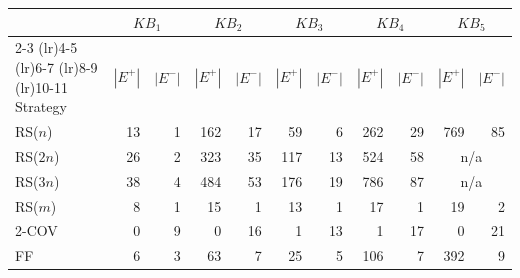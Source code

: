 \begin{tabular}{lrrrrrrrrrr}
\toprule
 & \multicolumn{2}{c}{$KB_1$} & \multicolumn{2}{c}{$KB_2$} & \multicolumn{2}{c}{$KB_3$} & \multicolumn{2}{c}{$KB_4$} & \multicolumn{2}{c}{$KB_5$} \\
\cmidrule(lr){2-3} \cmidrule(lr){4-5} \cmidrule(lr){6-7} \cmidrule(lr){8-9} \cmidrule(lr){10-11}
Strategy & $|E^+|$ & $|E^-|$ & $|E^+|$ & $|E^-|$ & $|E^+|$ & $|E^-|$ & $|E^+|$ & $|E^-|$ & $|E^+|$ & $|E^-|$ \\
\midrule
RS($n$) & 13 & 1 & 162 & 17 & 59 & 6 & 262 & 29 & 769 & 85 \\
RS($2n$) & 26 & 2 & 323 & 35 & 117 & 13 & 524 & 58 & \multicolumn{2}{c}{n/a} \\
RS($3n$) & 38 & 4 & 484 & 53 & 176 & 19 & 786 & 87 & \multicolumn{2}{c}{n/a} \\
RS($m$) & 8 & 1 & 15 & 1 & 13 & 1 & 17 & 1 & 19 & 2 \\
2-COV & 0 & 9 & 0 & 16 & 1 & 13 & 1 & 17 & 0 & 21 \\
FF & 6 & 3 & 63 & 7 & 25 & 5 & 106 & 7 & 392 & 9 \\
\bottomrule
\end{tabular}

